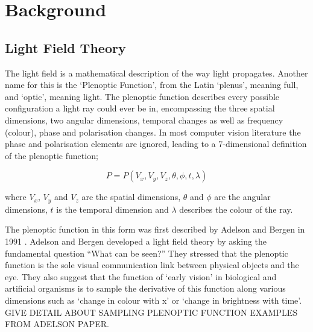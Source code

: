 
\chapter{Background}

\section{Light Field Theory}



The light field is a mathematical description of the way light propagates.
Another name for this is the ‘Plenoptic Function', from the Latin ‘plenus’, meaning full, and ‘optic’, meaning light.
The plenoptic function describes every possible configuration a light ray could ever be in, encompassing the three spatial dimensions, two angular dimensions, temporal changes as well as frequency (colour), phase and polarisation changes.
In most computer vision literature the phase and polarisation elements are ignored, leading to a 7-dimensional definition of the plenoptic function;

\begin{equation}
\label{eq:plenoptic_function}
P = P(V_x, V_y, V_z, \theta, \phi, t, \lambda)
\end{equation}

where $V_x$, $V_y$ and $V_z$ are the spatial dimensions, $\theta$ and $\phi$ are the angular dimensions, $t$ is the temporal dimension and $\lambda$ describes the colour of the ray. 

The plenoptic function in this form was first described by Adelson and Bergen in 1991 \cite{adelson1991plenoptic}.
Adelson and Bergen developed a light field theory by asking the fundamental question \enquote{What can be seen?} They stressed that the plenoptic function is the sole visual communication link between physical objects and the eye.
They also suggest that the function of \enquote*{early vision} in biological and artificial organisms is to sample the derivative of this function along various dimensions such as \enquote*{change in colour with x} or \enquote*{change in brightness with time}.
GIVE DETAIL ABOUT SAMPLING PLENOPTIC FUNCTION EXAMPLES FROM ADELSON PAPER.


